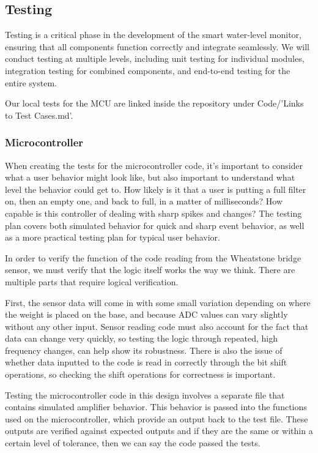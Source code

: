 \subsection{Testing}

Testing is a critical phase in the development of the smart water-level monitor, ensuring that all components function correctly 
and integrate seamlessly. We will conduct testing at multiple levels, including unit testing for individual modules, integration testing 
for combined components, and end-to-end testing for the entire system.

Our local tests for the MCU are linked inside the repository under Code/'Links to Test Cases.md'.

\subsubsection{Microcontroller}

When creating the tests for the microcontroller code, it's important to consider what a user behavior might look like, but also important to understand what level the behavior could get to. How likely is it that a user is putting a full filter on, then an empty one, and back to full, in a matter of milliseconds? How capable is this controller of dealing with sharp spikes and changes? The testing plan covers both simulated behavior for quick and sharp event behavior, as well as a more practical testing plan for typical user behavior. 

In order to verify the function of the code reading from the Wheatstone bridge sensor, we must verify that the logic itself works the way we think. There are multiple parts that require logical verification. 

First, the sensor data will come in with some small variation depending on where the weight is placed on the base, and because ADC values can vary slightly  without any other input. Sensor reading code must also account for the fact that data can change very quickly, so testing the logic through repeated, high frequency changes, can help show its robustness. There is also the issue of whether data inputted to the code is read in correctly through the bit shift operations, so checking the shift operations for correctness is important. 

Testing the microcontroller code in this design involves a separate file that contains simulated amplifier behavior. This behavior is passed into the functions used on the microcontroller, which provide an output back to the test file. These outputs are verified against expected outputs and if they are the same or within a certain level of tolerance, then we can say the code passed the tests. 

